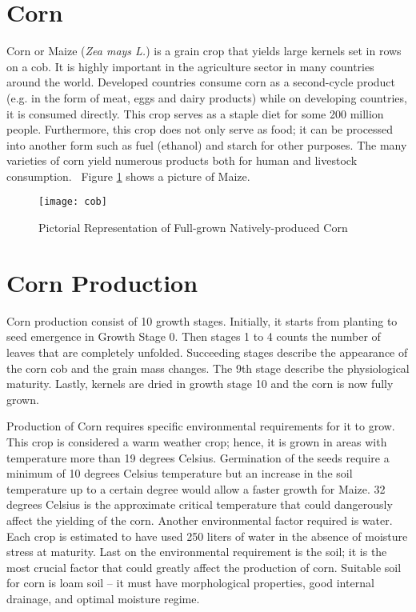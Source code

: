 \section{Corn}

Corn or Maize (\textit{Zea mays L.}) is a grain crop that yields large kernels set in rows on a cob. It is highly important in the agriculture sector in many countries around the world. Developed countries consume corn as a second-cycle product (e.g. in the form of meat, eggs and dairy products) while on developing countries, it is consumed directly. This crop serves as a staple diet for some 200 million people. Furthermore, this crop does not only serve as food; it can be processed into another form such as fuel (ethanol) and starch for other purposes. The many varieties of corn yield numerous products both for human and livestock consumption.~\cite{Jean2003} Figure \ref{fig:corn} shows a picture of Maize.

\begin{figure}[!htbp]
	\centering
		\texttt{[image: cob]}
	\caption{Pictorial Representation of Full-grown Natively-produced Corn~\cite{Jean2003}}
	\label{fig:corn}
\end{figure}

\section{Corn Production}

	Corn production consist of 10 growth stages. Initially, it starts from planting to seed emergence in Growth Stage 0. Then stages 1 to 4 counts the number of leaves that are completely unfolded. Succeeding stages describe the appearance of the corn cob and the grain mass changes. The 9th stage describe the physiological maturity. Lastly, kernels are dried in growth stage 10 and the corn is now fully grown.

	Production of Corn requires specific environmental requirements for it to grow. This crop is considered a warm weather crop; hence, it is grown in areas with temperature more than 19 degrees Celsius. Germination of the seeds require a minimum of 10 degrees Celsius temperature but an increase in the soil temperature up to a certain degree would allow a faster growth for Maize. 32 degrees Celsius is the approximate critical temperature that could dangerously affect the yielding of the corn. Another environmental factor required is water. Each crop is estimated to have used 250 liters of water in the absence of moisture stress at maturity. Last on the environmental requirement is the soil; it is the most crucial factor that could greatly affect the production of corn. Suitable soil for corn is loam soil -- it must have morphological properties, good internal drainage, and optimal moisture regime.~\cite{Jean2003} 

